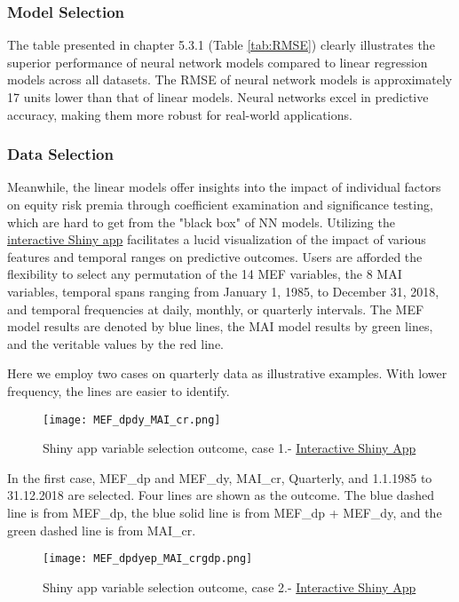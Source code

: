 \documentclass{article}
\begin{document}
\subsubsection{Model Selection}
The table presented in chapter 5.3.1 (Table \ref{tab:RMSE}) clearly illustrates the superior performance of neural network models compared to linear regression models across all datasets. The RMSE of neural network models is approximately 17 units lower than that of linear models. Neural networks excel in predictive accuracy, making them more robust for real-world applications.

\subsubsection{Data Selection}
Meanwhile, the linear models offer insights into the impact of individual factors on equity risk premia through coefficient examination and significance testing, which are hard to get from the "black box" of NN models. Utilizing the \href{https://baumender11.shinyapps.io/Alpha/}{interactive Shiny app} facilitates a lucid visualization of the impact of various features and temporal ranges on predictive outcomes. Users are afforded the flexibility to select any permutation of the 14 MEF variables, the 8 MAI variables, temporal spans ranging from January 1, 1985, to December 31, 2018, and temporal frequencies at daily, monthly, or quarterly intervals. The MEF model results are denoted by blue lines, the MAI model results by green lines, and the veritable values by the red line.

Here we employ two cases on quarterly data as illustrative examples. With lower frequency, the lines are easier to identify.

\begin{figure}[H]
    \centering \texttt{[image: MEF\_dpdy\_MAI\_cr.png]}
    \caption{Shiny app variable selection outcome, case 1.- \href{https://baumender11.shinyapps.io/Alpha/}{Interactive Shiny App}}
\end{figure}

\noindent In the first case, MEF\_dp and MEF\_dy, MAI\_cr, Quarterly, and 1.1.1985 to 31.12.2018 are selected. Four lines are shown as the outcome. The blue dashed line is from MEF\_dp, the blue solid line is from MEF\_dp + MEF\_dy, and the green dashed line is from MAI\_cr. 

\begin{figure}[H]
    \centering \texttt{[image: MEF\_dpdyep\_MAI\_crgdp.png]}
    \caption{Shiny app variable selection outcome, case 2.- \href{https://baumender11.shinyapps.io/Alpha/}{Interactive Shiny App}}
\end{figure}
\end{document}
